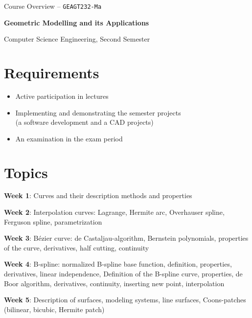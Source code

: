 \documentclass[a4paper,12pt]{article}
\begin{document}
\begin{center}
	{\Large Course Overview -- \texttt{GEAGT232-Ma}}

	\vskip 1cm

	{\huge \textbf{Geometric Modelling and its Applications}}
	
	\medskip
	
	{\large Computer Science Engineering, Second Semester}

\end{center}

\vskip 5mm

\section{Requirements}

\begin{itemize}
\item Active participation in lectures
\item Implementing and demonstrating the semester projects \\ (a software development and a CAD projects)
\item An examination in the exam period
\end{itemize}

\section{Topics}

\noindent \textbf{Week 1}:
Curves and their description methods and properties

\bigskip

\noindent \textbf{Week 2}:
Interpolation curves: Lagrange, Hermite arc, Overhauser spline, Ferguson spline, parametrization

\bigskip

\noindent \textbf{Week 3}:
Bézier curve: de Castaljau-algorithm, Bernstein polynomials, properties of the curve, derivatives, half cutting, continuity

\bigskip

\noindent \textbf{Week 4}:
B-spline: normalized B-spline base function, definition, properties, derivatives, linear independence, Definition of the B-spline curve, properties, de Boor algorithm, derivatives, continuity, inserting new point, interpolation

\bigskip

\noindent \textbf{Week 5}:
Description of surfaces, modeling systems, line surfaces, Coons-patches (bilinear, bicubic, Hermite patch)
\end{document}
